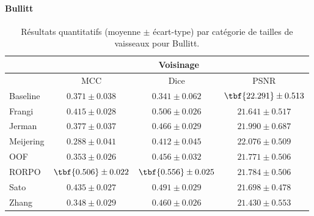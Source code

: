 \paragraph{Bullitt}

\begin{table}[H]
  \begin{center}
  \label{tab:Vessels size Bullitt}
  \caption{Résultats quantitatifs (moyenne $\pm$ écart-type) par catégorie de tailles de vaisseaux pour Bullitt.}
  
  \begin{tabular}{lccc}
            \hline
            & \multicolumn{3}{c}{Voisinage}                  \\
            \hline
            & MCC & Dice & PSNR  \\
            Baseline	    & $ 0.371 \pm 0.038 $ & $ 0.341 \pm 0.062 $ & $ \tbf{22.291} \pm	0.513 $ \\
            Frangi	      & $ 0.415 \pm 0.028 $ & $ 0.506 \pm 0.026 $ & $ 21.641 \pm	0.517 $ \\
            Jerman	      & $ 0.377 \pm 0.037 $ & $ 0.466 \pm 0.029 $ & $ 21.990 \pm	0.687 $ \\
            Meijering	    & $ 0.288 \pm 0.041 $ & $ 0.412 \pm 0.045 $ & $ 22.076 \pm	0.509 $ \\ 
            OOF	          & $ 0.353 \pm 0.026 $ & $ 0.456 \pm 0.032 $ & $ 21.771 \pm	0.506 $ \\
            RORPO	        & $ \tbf{0.506} \pm 0.022 $ & $ \tbf{0.556} \pm 0.025 $ & $ 21.784 \pm	0.506 $ \\
            Sato	        & $ 0.435 \pm 0.027 $ & $ 0.491 \pm 0.029 $ & $ 21.698 \pm	0.478 $ \\
            Zhang	        & $ 0.348 \pm 0.029 $ & $ 0.460 \pm 0.026 $ & $ 21.430 \pm	0.553 $ \\
      

\end{tabular}
\end{center}
\end{table}

